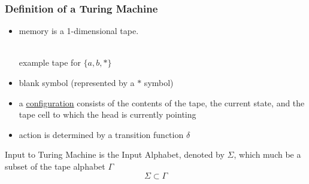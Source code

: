 \subsubsection*{Definition of a Turing Machine}
\begin{itemize}
  \item memory is a 1-dimensional tape. \\
         \\
        example tape for $\{a,b,*\}$
  \item blank symbol (represented by a $*$ symbol)
  \item a \underline{configuration} consists of the contents of the tape, the current state,
        and the tape cell to which the head is currently pointing \\
  \item action is determined by a transition function $\delta$
\end{itemize}
Input to Turing Machine is the Input Alphabet, denoted by $\Sigma$,
which much be a subset of the tape alphabet $\Gamma$
\[
  \Sigma \subset \Gamma
\]

